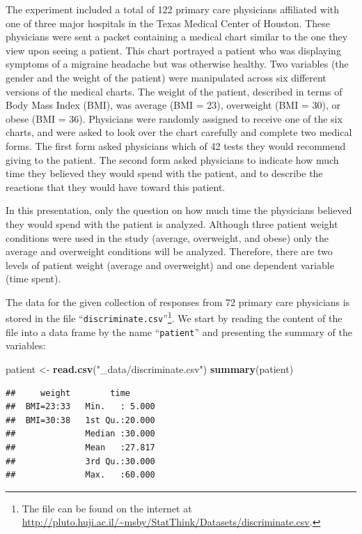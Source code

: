 \documentclass[]{krantz}
\makeatletter
\newenvironment{Shaded}{\begin{snugshade}}{\end{snugshade}}
\newcommand{\KeywordTok}[1]{\textcolor[rgb]{0.13,0.29,0.53}{\textbf{#1}}}
\newcommand{\StringTok}[1]{\textcolor[rgb]{0.31,0.60,0.02}{#1}}
\newcommand{\NormalTok}[1]{#1}
\newenvironment{kframe}{%
\medskip{}
\setlength{\fboxsep}{.8em}
 \def\at@end@of@kframe{}%
 \ifinner\ifhmode%
  \def\at@end@of@kframe{\end{minipage}}%
  \begin{minipage}{\columnwidth}%
 \fi\fi%
 \def\FrameCommand##1{\hskip\@totalleftmargin \hskip-\fboxsep
 \colorbox{shadecolor}{##1}\hskip-\fboxsep
     \hskip-\linewidth \hskip-\@totalleftmargin \hskip\columnwidth}%
 \MakeFramed {\advance\hsize-\width
   \@totalleftmargin\z@ \linewidth\hsize
   \@setminipage}}%
 {\par\unskip\endMakeFramed%
 \at@end@of@kframe}
\renewenvironment{Shaded}{\begin{kframe}}{\end{kframe}}
\theoremstyle{definition}
\theoremstyle{definition}
\theoremstyle{definition}
\theoremstyle{remark}
\makeatother
\begin{document}
The experiment included a total of 122 primary care physicians
affiliated with one of three major hospitals in the Texas Medical Center
of Houston. These physicians were sent a packet containing a medical
chart similar to the one they view upon seeing a patient. This chart
portrayed a patient who was displaying symptoms of a migraine headache
but was otherwise healthy. Two variables (the gender and the weight of
the patient) were manipulated across six different versions of the
medical charts. The weight of the patient, described in terms of Body
Mass Index (BMI), was average (BMI = 23), overweight (BMI = 30), or
obese (BMI = 36). Physicians were randomly assigned to receive one of
the six charts, and were asked to look over the chart carefully and
complete two medical forms. The first form asked physicians which of 42
tests they would recommend giving to the patient. The second form asked
physicians to indicate how much time they believed they would spend with
the patient, and to describe the reactions that they would have toward
this patient.

In this presentation, only the question on how much time the physicians
believed they would spend with the patient is analyzed. Although three
patient weight conditions were used in the study (average, overweight,
and obese) only the average and overweight conditions will be analyzed.
Therefore, there are two levels of patient weight (average and
overweight) and one dependent variable (time spent).

The data for the given collection of responses from 72 primary care
physicians is stored in the file ``\texttt{discriminate.csv}''\footnote{The
  file can be found on the internet at
  \url{http://pluto.huji.ac.il/~msby/StatThink/Datasets/discriminate.csv}.}.
We start by reading the content of the file into a data frame by the
name ``\texttt{patient}'' and presenting the summary of the variables:

\begin{Shaded}
\begin{Highlighting}[]
\NormalTok{patient <-}\StringTok{ }\KeywordTok{read.csv}\NormalTok{(}\StringTok{"_data/discriminate.csv"}\NormalTok{)}
\KeywordTok{summary}\NormalTok{(patient)}
\end{Highlighting}
\end{Shaded}

\begin{verbatim}
##     weight        time       
##  BMI=23:33   Min.   : 5.000  
##  BMI=30:38   1st Qu.:20.000  
##              Median :30.000  
##              Mean   :27.817  
##              3rd Qu.:30.000  
##              Max.   :60.000
\end{verbatim}
\end{document}
